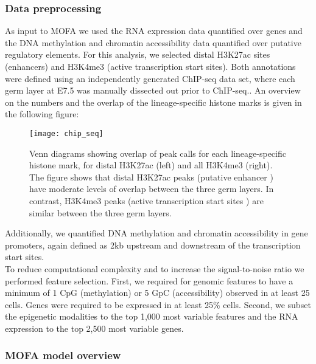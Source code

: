 \subsubsection{Data preprocessing}

As input to MOFA we used the RNA expression data quantified over genes and the DNA methylation and chromatin accessibility data quantified over putative regulatory elements. For this analysis, we selected distal H3K27ac sites (enhancers) and H3K4me3 (active transcription start sites). Both annotations were defined using an independently generated ChIP-seq data set, where each germ layer at E7.5 was manually dissected out prior to ChIP-seq.\cite{Xiang2020}. An overview on the numbers and the overlap of the lineage-specific histone marks is given in the following figure:

\begin{figure}[H]
	\texttt{[image: chip\_seq]}
	\caption{
	Venn diagrams showing overlap of peak calls for each lineage-specific histone mark, for distal H3K27ac (left) and all H3K4me3 (right). The figure shows that distal H3K27ac peaks (putative enhancer \cite{Creyghton2010}) have moderate levels of overlap between the three germ layers. In contrast, H3K4me3 peaks (active transcription start sites \cite{Liang2004}) are similar between the three germ layers.
	}
	\label{fig:chip_seq}
\end{figure}

Additionally, we quantified DNA methylation and chromatin accessibility in gene promoters, again defined as 2kb upstream and downstream of the transcription start sites.\\
To reduce computational complexity and to increase the signal-to-noise ratio we performed feature selection. First, we required for genomic features to have a minimum of 1 CpG (methylation) or 5 GpC (accessibility) observed in at least 25 cells. Genes were required to be expressed in at least 25\% cells. Second, we subset the epigenetic modalities to the top 1,000 most variable features and the RNA expression to the top 2,500 most variable genes.

\subsubsection{MOFA model overview}

